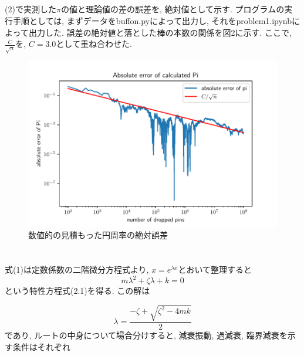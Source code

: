 \documentclass[a4paper,dvipdfmx]{jarticle}
\begin{document}
\subsection{}
\noindent
(2)で実測した$\pi$の値と理論値の差の誤差を, 絶対値として示す. 
プログラムの実行手順としては, まずデータをbuffon.pyによって出力し,
それをproblem1.ipynbによって出力した.
誤差の絶対値と落とした棒の本数の関係を図2に示す.
ここで,$\frac{C}{\sqrt{n}}$を, $C=3.0$として重ね合わせた.
\begin{figure}[H]
    \centering
    \includegraphics[scale=0.6]{./problem_1/problem1-3.pdf}
    \caption{数値的の見積もった円周率の絶対誤差}
\end{figure}

\newpage


\section{}
\subsection{}

\noindent
式(1)は定数係数の二階微分方程式より, $x=e^{\lambda x}$とおいて整理すると
\begin{equation}
    m\lambda^2 + \zeta\lambda + k = 0 \tag{2.1}
\end{equation}
という特性方程式(2.1)を得る. この解は

\begin{equation}
    \lambda = \frac{-\zeta + \sqrt{\zeta^2 - 4mk}}{2} \tag{2.2}
\end{equation}
であり, ルートの中身について場合分けすると, 減衰振動, 過減衰, 臨界減衰を示す条件はそれぞれ
\end{document}

